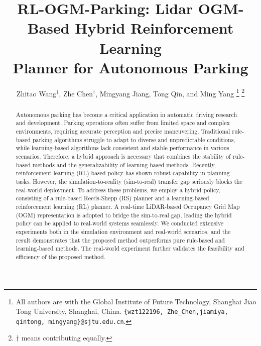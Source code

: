 \documentclass[ conference]{./support/ieeeconf}
\title{\LARGE \bf RL-OGM-Parking: Lidar OGM-Based Hybrid Reinforcement Learning \\ Planner for Autonomous Parking }
\author{Zhitao Wang$^{\dag}$, Zhe Chen$^{\dag}$, Mingyang Jiang, Tong Qin, and Ming Yang
        \thanks{All authors are with the Global Institute of Future Technology, Shanghai Jiao Tong University, Shanghai, China.
		{\tt\small  \{wzt122196, Zhe{\_}Chen,jiamiya, qintong, mingyang\}@sjtu.edu.cn}.   
	}
 \thanks{$\dag$ means contributing equally.}
 }
\begin{document}
\maketitle
\thispagestyle{empty}
\pagestyle{empty}

\begin{abstract}
Autonomous parking has become a critical application in automatic driving research and development. 
Parking operations often suffer from limited space and complex environments, requiring accurate perception and precise maneuvering. 
Traditional rule-based parking algorithms struggle to adapt to diverse and unpredictable conditions, while learning-based algorithms lack consistent and stable performance in various scenarios. 
Therefore, a hybrid approach is necessary that combines the stability of rule-based methods and the generalizability of learning-based methods.
Recently, reinforcement learning (RL) based policy has shown robust capability in planning tasks.
However, the simulation-to-reality (sim-to-real) transfer gap seriously blocks the real-world deployment. 
To address these problems, we employ a hybrid policy, consisting of a rule-based Reeds-Shepp (RS) planner and a learning-based reinforcement learning (RL) planner.
A real-time LiDAR-based Occupancy Grid Map (OGM) representation is adopted to bridge the sim-to-real gap, leading the hybrid policy can be applied to real-world systems seamlessly.  
We conducted extensive experiments both in the simulation environment and real-world scenarios, and the result demonstrates that the proposed method outperforms pure rule-based and learning-based methods.
The real-world experiment further validates the feasibility and efficiency of the proposed method.
\end{abstract}


 
\end{document}
